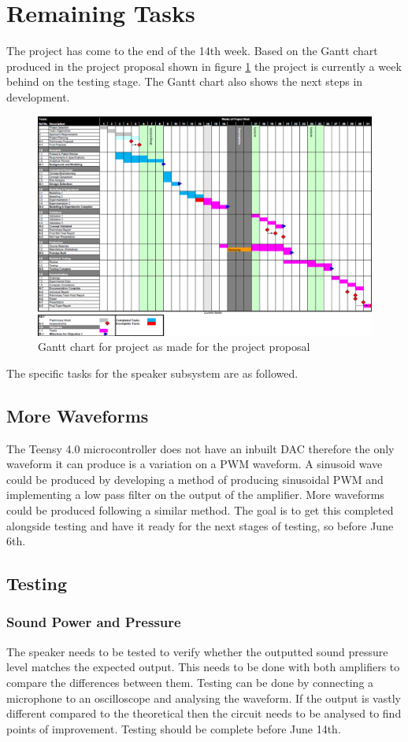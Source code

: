\documentclass[12pt, a4paper]{article}
\begin{document}
\section{Remaining Tasks}
The project has come to the end of the 14th week. Based on the Gantt chart produced in the project proposal shown in figure \ref{fig:ganttChart} the project is currently a week behind on the testing stage. The Gantt chart also shows the next steps in development. 
\begin{figure} [!htb]
	\hfill\includegraphics[width=\textwidth]{./Figures/Gantt_Chart}\hspace*{\fill}
	\caption{Gantt chart for project as made for the project proposal}
	\label{fig:ganttChart}
\end{figure}

The specific tasks for the speaker subsystem are as followed.
\subsection{More Waveforms}
The Teensy 4.0 microcontroller does not have an inbuilt DAC therefore the only waveform it can produce is a variation on a PWM waveform. A sinusoid wave could be produced by developing a method of producing sinusoidal PWM and implementing a low pass filter on the output of the amplifier. More waveforms could be produced following a similar method. The goal is to get this completed alongside testing and have it ready for the next stages of testing, so before June 6th.\\
\subsection{Testing}
\subsubsection{Sound Power and Pressure}
The speaker needs to be tested to verify whether the outputted sound pressure level matches the expected output. This needs to be done with both amplifiers to compare the differences between them. Testing can be done by connecting a microphone to an oscilloscope and analysing the waveform. If the output is vastly different compared to the theoretical then the circuit needs to be analysed to find points of improvement. Testing should be complete before June 14th.\\
\end{document}
